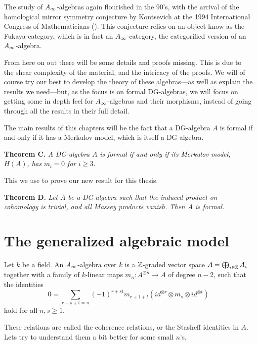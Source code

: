 The study of $\A$-algebras again flourished in the 90's, with the arrival of the homological mirror symmetry conjecture by Kontsevich at the 1994 International Congress of Mathematicians (\cite{kontsevich}). This conjecture relies on an object know as the Fukaya-category, which is in fact an $\A$-category, the categorified version of an $\A$-algebra.

From here on out there will be some details and proofs missing. This is due to the shear complexity of the material, and the intricacy of the proofs. We will of course try our best to develop the theory of these algebras---as well as explain the results we need---but, as the focus is on formal DG-algebras, we will focus on getting some in depth feel for $\A$-algebras and their morphisms, instead of going through all the results in their full detail.

The main results of this chapters will be the fact that a DG-algebra $A$ is formal if and only if it has a Merkulov model, which is itself a DG-algebra. 

\textbf{Theorem C.} \textit{A DG-algebra $A$ is formal if and only if its Merkulov model, $H(A)$, has $m_i=0$ for $i\geq 3$.}

This we use to prove our new result for this thesis. 

\textbf{Theorem D.} \textit{Let $A$ be a DG-algebra such that the induced product on cohomology is trivial, and all Massey products vanish. Then $A$ is formal.}

\section{The generalized algebraic model}

\begin{definition}[$\A$-algebra]
\label{def:A_infinity-algebra}
Let $k$ be a field. An $\A$-algebra over $k$ is a $\mathbb{Z}$-graded vector space $A=\bigoplus_{i\in \mathbb{Z}}A_i$ together with a family of $k$-linear maps $m_n : A^{\otimes n}\rightarrow A$ of degree $n-2$, such that the identities 
\begin{equation*}
    0=\sum_{r+s+t = n}(-1)^{r+st}m_{r+1+t}(id^{\otimes r}\otimes m_s \otimes id^{\otimes t})
\end{equation*}
hold for all $n, s\geq 1$. 
\end{definition}

These relations are called the coherence relations, or the Stasheff identities in $A$. Lets try to understand them a bit better for some small $n$'s. 

